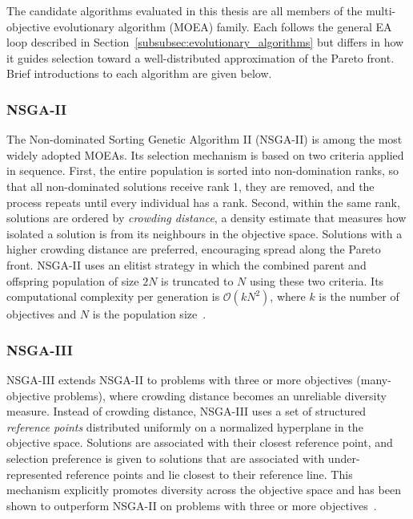 The candidate algorithms evaluated in this thesis are all members of the multi-objective evolutionary algorithm (MOEA) family. Each follows the
general EA loop described in Section~\ref{subsubsec:evolutionary_algorithms} but differs in how it guides selection toward a well-distributed
approximation of the Pareto front. Brief introductions to each algorithm are given below.

\subsubsection{NSGA-II}
\label{subsubsec:nsga2}

The Non-dominated Sorting Genetic Algorithm II (NSGA-II) is among the most widely adopted MOEAs. Its selection mechanism is based on two criteria
applied in sequence. First, the entire population is sorted into non-domination ranks, so that all non-dominated solutions receive rank 1, they are
removed, and the process repeats until every individual has a rank. Second, within the same rank, solutions are ordered by \emph{crowding distance}, a
density estimate that measures how isolated a solution is from its neighbours in the objective space. Solutions with a higher crowding distance are
preferred, encouraging spread along the Pareto front. NSGA-II uses an elitist strategy in which the combined parent and offspring population of size
$2N$ is truncated to $N$ using these two criteria. Its computational complexity per generation is $\mathcal{O}(kN^2)$, where $k$ is the number of
objectives and $N$ is the population size~\cite{nsga2}.

\subsubsection{NSGA-III}
\label{subsubsec:nsga3}

NSGA-III extends NSGA-II to problems with three or more objectives (many-objective problems), where crowding distance becomes an unreliable diversity
measure. Instead of crowding distance, NSGA-III uses a set of structured \emph{reference points} distributed uniformly on a normalized hyperplane in
the objective space. Solutions are associated with their closest reference point, and selection preference is given to solutions that are associated
with under-represented reference points and lie closest to their reference line. This mechanism explicitly promotes diversity across the objective
space and has been shown to outperform NSGA-II on problems with three or more objectives~\cite{nsga3}.

